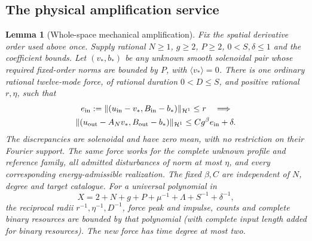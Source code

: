 \documentclass[11pt,a4paper]{amsart}
\newtheorem{lemma}[theorem]{Lemma}
\theoremstyle{definition}
\theoremstyle{remark}
\numberwithin{equation}{section}
\newcommand{\Hcal}{\mathcal H}
\newcommand{\norm}[1]{\lVert #1\rVert}
\newcommand{\mean}[1]{\langle #1\rangle}
\begin{document}
\subsection{The physical amplification service}
\begin{lemma}[Whole-space mechanical amplification]\label{lem:amplifier}
Fix the spatial derivative order used above once.  Supply rational
$N\ge1$, $g\ge2$, $P\ge2$, $0<S,\delta\le1$ and the coefficient bounds.
Let $(v_*,b_*)$ be any unknown smooth solenoidal pair whose required
fixed-order norms are bounded by $P$, with $\mean{v_*}=0$.
There is one ordinary rational twelve-mode force, of rational
duration $0<D\le S$, and positive rational $r,\eta$, such that
\begin{equation}\label{eq:amplifier-service}
 \begin{gathered}
 e_{\rm in}:=\norm{(u_{\rm in}-v_*,B_{\rm in}-b_*)}_{\Hcal^1}\le r
 \quad\Longrightarrow\\
 \norm{(u_{\rm out}-A_Nv_*,B_{\rm out}-b_*)}_{\Hcal^1}
 \le Cg^\beta e_{\rm in}+\delta .
 \end{gathered}
\end{equation}
The discrepancies are solenoidal and have zero mean, with no restriction
on their Fourier support.  The same force works for the complete
unknown profile and reference family, all admitted disturbances of norm
at most $\eta$, and every corresponding energy-admissible realization.
The fixed $\beta,C$ are independent of $N$, degree and target catalogue.
For a universal polynomial in
\[
 X=2+N+g+P+\mu^{-1}+\Lambda+S^{-1}+\delta^{-1},
\]
the reciprocal radii $r^{-1},\eta^{-1},D^{-1}$, force peak and impulse,
counts and complete binary resources are bounded by that polynomial
(with complete input length added for binary resources).
The new force has time degree at most two.
\end{lemma}
\end{document}
